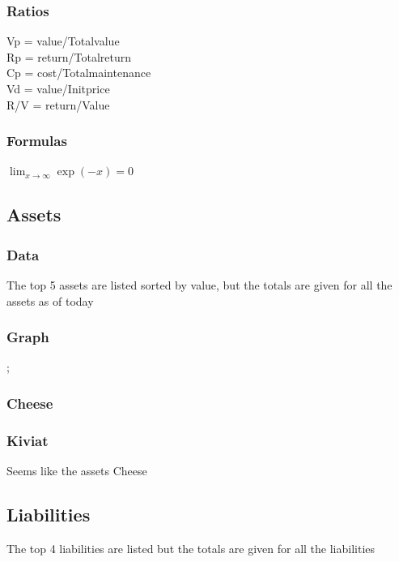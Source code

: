 \documentclass[8pt]{article} %
\begin{document}
\subsubsection{Ratios}
{\footnotesize
Vp = value/Totalvalue\\
Rp = return/Totalreturn\\
Cp = cost/Totalmaintenance\\
Vd = value/Initprice\\
R/V = return/Value\\}

\subsubsection{Formulas}

{\footnotesize
$\lim_{x \to \infty} \exp(-x) = 0$\\
}

\subsection{Assets}

\subsubsection{Data}
The top 5 assets are listed sorted by value, but the totals are given for all the assets as of today\\



\subsubsection{Graph}
;

\subsubsection{Cheese}


\subsubsection{Kiviat}

Seems like the assets Cheese 

\subsection{Liabilities}
The top 4 liabilities are listed but the totals are given for all the liabilities\\
\end{document}
